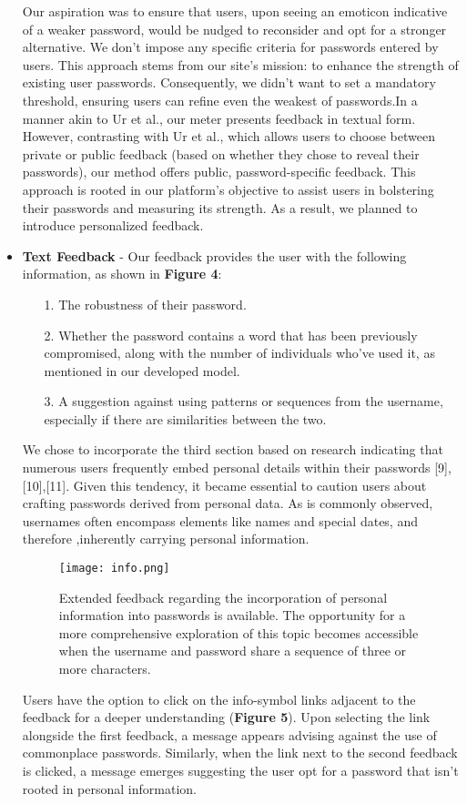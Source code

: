 \documentclass[5p,twocolumn]{elsarticle}
\begin{document}
\begin{itemize}
 Our aspiration was to ensure that users, upon seeing an emoticon indicative of a weaker password, would be nudged to reconsider and opt for a stronger alternative.
We don't impose any specific criteria for passwords entered by users. This approach stems from our site's mission: to enhance the strength of existing user passwords. Consequently, we didn’t want to set a mandatory threshold, ensuring users can refine even the weakest of passwords.In a manner akin to Ur et al., our meter presents feedback in textual form. However, contrasting with Ur et al., which allows users to choose between private or public feedback (based on whether they chose to reveal their passwords), our method offers public, password-specific feedback. This approach is rooted in our platform's objective to assist users in bolstering their passwords and measuring its strength. As a result, we planned to introduce personalized feedback.
\item \textbf{Text Feedback} - Our feedback provides the user with the following information, as shown in \textbf{Figure 4}: 
\begin{enumerate}
\item[1.] 
The robustness of their password.
\item[2.] 
Whether the password contains a word that has been previously compromised, along with the number of individuals who've used it, as mentioned in our developed model.
\item[3.] 
A suggestion against using patterns or sequences from the username, especially if there are similarities between the two. 
\end{enumerate}
We chose to incorporate the third section based on research indicating that numerous users frequently embed personal details within their passwords [9],[10],[11]. Given this tendency, it became essential to caution users about crafting passwords derived from personal data. As is commonly observed, usernames often encompass elements like names and special dates, and therefore ,inherently carrying personal information.
    \begin{figure}[h]
\centering 
\texttt{[image: info.png]}
\caption{Extended feedback regarding the incorporation of personal information into passwords is available. The opportunity for a more comprehensive exploration of this topic becomes accessible when the username and password share a sequence of three or more characters.}
\label{fig_mom0}%
\end{figure}
 Users have the option to click on the info-symbol links adjacent to the feedback for a deeper understanding (\textbf{Figure 5}). Upon selecting the link alongside the first feedback, a message appears advising against the use of commonplace passwords. Similarly, when the link next to the second feedback is clicked, a message emerges suggesting the user opt for a password that isn't rooted in personal information.
\end{itemize}
\end{document}
